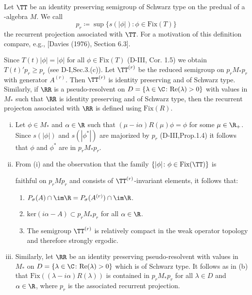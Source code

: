 Let $\TT$ be an identity preserving semigroup of Schwarz type on the predual of a \WA-algebra $M$.
We call
\[
p_{r} \coloneqq \sup\{s(|\phi|) \colon \phi \in \text{Fix}(T)\}
\]
the recurrent projection associated with $\TT$.
For a motivation of this definition compare, e.g., [Davies (1976), Section 6.3].

Since $T(t)|\phi| = |\phi|$ for all $\phi \in \text{Fix}(T)$ (D-III, Cor. 1.5) we obtain $T(t)'p_{r} \geq p_{r}$ (see D-I,Sec.3.(c)).
Let $\TT^{(r)}$ be the reduced semigroup on $p_{r}M_{*}p_{r}$ with generator $A^{(r)}$.
Then $\TT^{(r)}$ is identity preserving and of Schwarz type.
Similarly, if $\RR$ is a pseudo-resolvent on $D = \{\lambda \in \C \colon \text{Re}(\lambda) > 0\}$ with values in $M_{*}$ such that $\RR$ is identity preserving and of Schwarz type, then the recurrent projecton associated with $\RR$ is defined using $\text{Fix}(R)$.

\begin{remark}\label{rem:d4-3.2}
\begin{enumerate}[(i)]
\item
Let $\phi \in M_{*}$ and $\alpha \in \R$ such that $(\mu - i\alpha)R(\mu)\phi = \phi$ for some $\mu \in \R_{+}$.
Since $s(|\phi|)$ and $s(|\phi^{*}|)$ are majorized by $p_{r}$ (D-III,Prop.1.4) it follows that $\phi$ and $\phi^{*}$ are in $p_{r}M_{*}p_{r}$.

\item
From (i) and the observation that the family $\{|\phi| \colon \phi \in \text{Fix}(\TT)\}$ is

\newpage

faithful on $p_{r}Mp_{r}$ and consists of $\TT^{(r)}$-invariant elements, it follows that:

\begin{enumerate}[--]
\item
$P_{\sigma}(A) \cap \im\R = P_{\sigma}(A^{(r)}) \cap \im\R$.

\item
$\text{ker}(i\alpha - A) \subset p_{r}M_{*}p_{r}$ for all $\alpha \in \R$.

\item
The semigroup $\TT^{(r)}$ is relatively compact in the weak operator topology and therefore strongly ergodic.
\end{enumerate}


\item
Similarly, let $\RR$ be an identity preserving pseudo-resolvent with values in $M_{*}$ on $D = \{\lambda \in \C \colon \text{Re}(\lambda) > 0\}$ which is of Schwarz type.
It follows as in (b) that $\text{Fix}((\lambda - i\alpha)R(\lambda))$ is contained in $p_{r}M_{*}p_{r}$ for all $\lambda \in D$ and $\alpha \in \R$, where $p_{r}$ is the associated recurrent projection.
\end{enumerate}
\end{remark}

